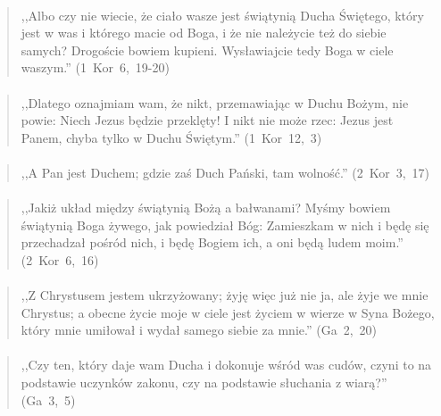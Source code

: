 \documentclass[10pt,a4paper,oneside]{article}
\begin{document}
\paragraph{}
\begin{quote}
,,Albo czy nie wiecie, że ciało wasze jest świątynią Ducha Świętego, który jest w was i którego macie od Boga, i że nie należycie też do siebie samych? Drogoście bowiem kupieni. Wysławiajcie tedy Boga w ciele waszym.'' \mbox{(1 Kor 6, 19-20)}
\end{quote}
\paragraph{}
\begin{quote}
,,Dlatego oznajmiam wam, że nikt, przemawiając w Duchu Bożym, nie powie: Niech Jezus będzie przeklęty! I nikt nie może rzec: Jezus jest Panem, chyba tylko w Duchu Świętym.'' \mbox{(1 Kor 12, 3)}
\end{quote}
\paragraph{}
\begin{quote}
,,A Pan jest Duchem; gdzie zaś Duch Pański, tam wolność.'' \mbox{(2 Kor 3, 17)}
\end{quote}
\paragraph{}
\begin{quote}
,,Jakiż układ między świątynią Bożą a bałwanami? Myśmy bowiem świątynią Boga żywego, jak powiedział Bóg: Zamieszkam w nich i będę się przechadzał pośród nich, i będę Bogiem ich, a oni będą ludem moim.'' \mbox{(2 Kor 6, 16)}
\end{quote}
\paragraph{}
\begin{quote}
,,Z Chrystusem jestem ukrzyżowany; żyję więc już nie ja, ale żyje we mnie Chrystus; a obecne życie moje w ciele jest życiem w wierze w Syna Bożego, który mnie umiłował i wydał samego siebie za mnie.'' \mbox{(Ga 2, 20)}
\end{quote}
\paragraph{}
\begin{quote}
,,Czy ten, który daje wam Ducha i dokonuje wśród was cudów, czyni to na podstawie uczynków zakonu, czy na podstawie słuchania z wiarą?'' \mbox{(Ga 3, 5)}
\end{quote}
\end{document}
